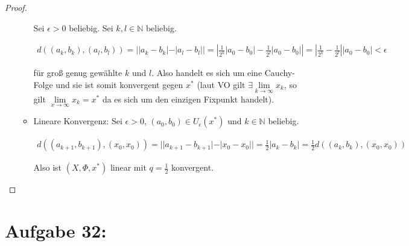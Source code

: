 \documentclass[]{article}
\begin{document}
\begin{proof}
\begin{enumerate}[label=\alph*)]
\begin{itemize}
			Sei $\epsilon > 0$ beliebig. Sei $k, l \in \mathbb{N}$ beliebig.
			
			\begin{align*}
				d((a_k, b_k), (a_l, b_l)) = ||a_k - b_k| - |a_l - b_l|| = \left|\frac{1}{2^{k}}|a_0 - b_0| - \frac{1}{2^{l}}|a_0 - b_0|\right| = \left|\frac{1}{2^{k}}-\frac{1}{2^{l}}\right||a_0 - b_0| < \epsilon
			\end{align*}
			
			für groß genug gewählte $k$ und $l$. Also handelt es sich um eine Cauchy-Folge und sie ist somit konvergent gegen $x^*$ (laut VO gilt $\exists \lim\limits_{k\rightarrow\infty}x_k$, so gilt $\lim\limits_{x\rightarrow\infty}x_k = x^*$ da es sich um den einzigen Fixpunkt handelt).
			
			\item Lineare Konvergenz: Sei $\epsilon >0$, $(a_0, b_0) \in U_\epsilon(x^*)$ und $k \in \mathbb{N}$ beliebig.
			
			\begin{align*}
				d((a_{k+1}, b_{k+1}), (x_0, x_0)) = ||a_{k+1} - b_{k+1}| - |x_0 - x_0|| = \frac{1}{2}|a_{k} - b_{k}| = \frac{1}{2} d((a_k, b_k), (x_0, x_0))
			\end{align*}
			
			Also ist $(X, \Phi, x^*)$ linear mit $q=\frac{1}{2}$ konvergent.
		\end{itemize}
		
	\end{enumerate}
	
\end{proof}

\newpage

\section{Aufgabe 32:}
\end{document}
